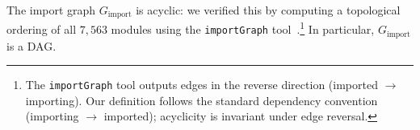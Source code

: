 The import graph $G_{\mathrm{import}}$ is acyclic: we verified this by computing a topological ordering of all $7{,}563$ modules using the \texttt{importGraph} tool~\cite{importgraph}.\footnote{The \texttt{importGraph} tool outputs edges in the reverse direction (imported $\to$ importing). Our definition follows the standard dependency convention (importing $\to$ imported); acyclicity is invariant under edge reversal.} In particular, $G_{\mathrm{import}}$ is a DAG.
